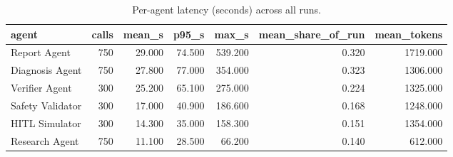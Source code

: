 \begin{table}[t]
\centering
\small
\begin{tabular}{lrrrrrr}
\toprule
agent & calls & mean\_s & p95\_s & max\_s & mean\_share\_of\_run & mean\_tokens \\
\midrule
Report Agent & 750 & 29.000 & 74.500 & 539.200 & 0.320 & 1719.000 \\
Diagnosis Agent & 750 & 27.800 & 77.000 & 354.000 & 0.323 & 1306.000 \\
Verifier Agent & 300 & 25.200 & 65.100 & 275.000 & 0.224 & 1325.000 \\
Safety Validator & 300 & 17.000 & 40.900 & 186.600 & 0.168 & 1248.000 \\
HITL Simulator & 300 & 14.300 & 35.000 & 158.300 & 0.151 & 1354.000 \\
Research Agent & 750 & 11.100 & 28.500 & 66.200 & 0.140 & 612.000 \\
\bottomrule
\end{tabular}
\caption{Per-agent latency (seconds) across all runs.}
\label{tab:rigor_latency}
\end{table}

